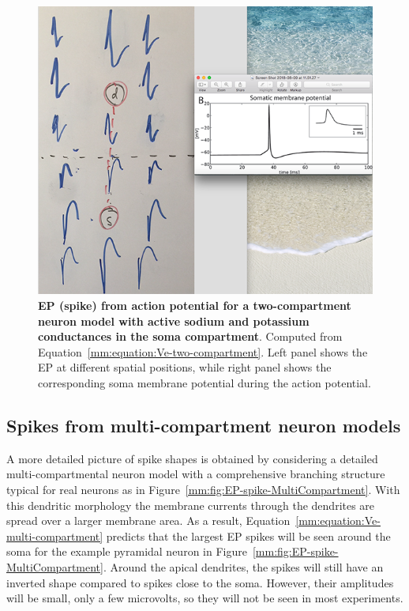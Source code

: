 \begin{figure}[!ht]
\begin{center}
\includegraphics{Figures/Spikes/EP-spike-TwoCompartment-w100-r150}
\end{center}
\caption{\textbf{EP (spike) from action potential for a two-compartment neuron model with active sodium
and potassium conductances in the soma compartment}. Computed from 
Equation~\ref{mm:equation:Ve-two-compartment}.
Left panel shows the EP at different spatial positions, while right panel shows the corresponding
soma membrane potential during the action potential. 
}
\label{spikes:fig:EP-spike-TwoCompartment}
\end{figure}



\subsection{Spikes from multi-compartment neuron models}
\label{mm:sec:EP-spikes-multi-compartment}
A more detailed picture of spike shapes is obtained by considering a detailed multi-compartmental neuron model
with a comprehensive branching structure typical for real neurons as in Figure~\ref{mm:fig:EP-spike-MultiCompartment}.
With this dendritic morphology the membrane currents through the dendrites are spread over a larger membrane area.
As a result, Equation~\ref{mm:equation:Ve-multi-compartment} predicts that the largest EP spikes will be seen
around the soma for the example pyramidal neuron in Figure~\ref{mm:fig:EP-spike-MultiCompartment}.  
Around the apical dendrites, the spikes will still have an inverted shape compared to spikes close to the soma. 
However, their amplitudes will be small, only a few microvolts, so they will not be seen in most experiments.


